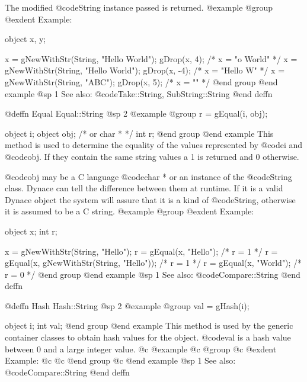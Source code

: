 The modified @code{String} instance passed is returned.
@example
@group
@exdent Example:

object  x, y;

x = gNewWithStr(String, "Hello World");
gDrop(x, 4);   /*  x = "o World"    */
x = gNewWithStr(String, "Hello World");
gDrop(x, -4);   /*  x = "Hello W"    */
x = gNewWithStr(String, "ABC");
gDrop(x, 5);   /*  x = ""    */
@end group
@end example
@sp 1
See also:  @code{Take::String, SubString::String}
@end deffn










@deffn {Equal} Equal::String
@sp 2
@example
@group
r = gEqual(i, obj);

object  i;
object  obj;  /*  or char *  */
int     r;
@end group
@end example
This method is used to determine the equality of the values represented
by @code{i} and @code{obj}.  If they contain the same string values a
1 is returned and 0 otherwise.

@code{obj} may be a C language @code{char *} or an instance of the
@code{String} class.  Dynace can tell the difference between them at
runtime.  If it is a valid Dynace object the system will assure that it is
a kind of @code{String}, otherwise it is assumed to be a C string.
@example
@group
@exdent Example:

object  x;
int     r;

x = gNewWithStr(String, "Hello");
r = gEqual(x, "Hello");                /*  r = 1  */
r = gEqual(x, gNewWithStr(String, "Hello"));  /*  r = 1  */
r = gEqual(x, "World");                /*  r = 0  */
@end group
@end example
@sp 1
See also:  @code{Compare::String}
@end deffn














@deffn {Hash} Hash::String
@sp 2
@example
@group
val = gHash(i);

object  i;
int     val;
@end group
@end example
This method is used by the generic container classes to obtain hash
values for the object.  @code{val} is a hash value between 0 and a large
integer value.
@c @example
@c @group
@c @exdent Example:
@c
@c @end group
@c @end example
@sp 1
See also:  @code{Compare::String}
@end deffn









